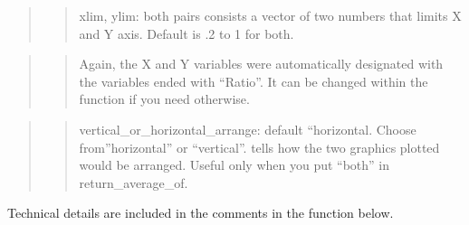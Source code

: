 \documentclass[
]{article}
\begin{document}
\begin{quote}
\begin{quote}
xlim, ylim: both pairs consists a vector of two numbers that limits X
and Y axis. Default is .2 to 1 for both.
\end{quote}
\end{quote}

\begin{quote}
\begin{quote}
Again, the X and Y variables were automatically designated with the
variables ended with ``Ratio''. It can be changed within the function if
you need otherwise.
\end{quote}
\end{quote}

\begin{quote}
\begin{quote}
vertical\_or\_horizontal\_arrange: default ``horizontal. Choose
from''horizontal'' or ``vertical''. tells how the two graphics plotted
would be arranged. Useful only when you put ``both'' in
return\_average\_of.
\end{quote}
\end{quote}

Technical details are included in the comments in the function below.
\end{document}
